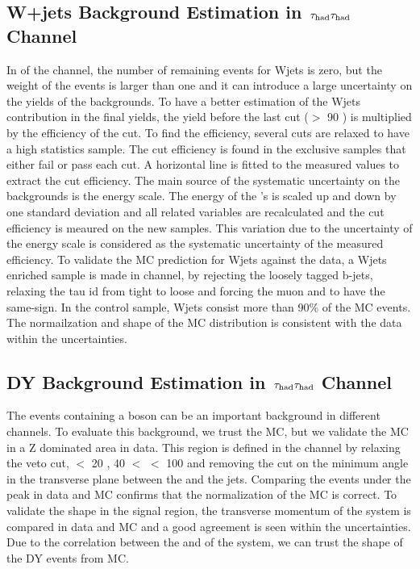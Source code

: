 \subsection{\texorpdfstring{W+jets Background Estimation in $\,\tau_{\rm had}\tau_{\rm had}$ Channel}{W+jets Background Estimation in tau-tau Channel}}
In \binone of the \tauTau channel, the number of remaining events for Wjets is zero, but the weight of the events is larger than one and 
it can introduce a large uncertainty on the yields of the backgrounds. To have a better estimation of the Wjets contribution in the final yields,
the yield before the last cut (\mttwo $>$ 90 \GeV) is multiplied by the efficiency of the cut. To find the efficiency, several cuts are relaxed 
to have a high statistics sample. The cut efficiency is found in the exclusive samples that either fail or pass each cut. 
A horizontal line is fitted to the measured values to extract the cut efficiency. The main source of the systematic uncertainty on the backgrounds 
is the \Tau energy scale. The energy of the \Tau's is scaled up and down by one standard deviation and all related variables are 
recalculated and the cut efficiency is meaured on the new samples. 
This variation due to the uncertainty of the \Tau energy scale is considered as the systematic uncertainty of the measured efficiency.
To validate the MC prediction for Wjets against the data, a Wjets enriched sample is made in \muTau channel, 
by rejecting the loosely tagged b-jets, relaxing the tau id from tight to loose and forcing the muon and \Tau to have the same-sign. 
In the control sample, Wjets consist more than 90\% of the MC events. The normailzation and shape of the MC distribution  is consistent
with the data within the uncertainties.

\subsection{\texorpdfstring{DY Background Estimation in $\,\tau_{\rm had}\tau_{\rm had}$ Channel}{DY Background Estimation in tau-tau Channel}}
The events containing a \Z boson can be an important background in different channels. To
evaluate this background, we trust the MC, but we validate the MC in a Z dominated area in
data. This region is defined in the \muTau channel by relaxing  the \Z veto cut, \mttwo $<$ 20 \GeV, 40 $<$ \tauMT $<$ 100 \GeV and 
removing the cut on the minimum angle in the transverse plane between the \MET and the jets. Comparing the events under the \Z peak in data and MC 
confirms that the normalization of the  MC is correct.  To validate the shape in the signal region, the transverse momentum of the \Z system is compared in data 
and MC  and a good agreement is seen within the uncertainties. Due to the correlation between the \mttwo and \pt of the \Z system, we can trust the shape of the 
DY events from MC.


